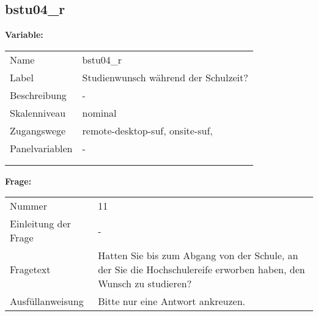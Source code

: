 	
	
	\subsection{bstu04\_r}
	\label{subSection:bstu04_r}

	\noindent\textbf{Variable:}\\
		\begin{tabular}{lL{11.3cm}}
			\label{tableVariable:bstu04_r}
			Name & bstu04\_r \\
			Label & Studienwunsch während der Schulzeit? \\
			Beschreibung & - \\
			Skalenniveau & nominal \\
			Zugangswege &
				remote-desktop-suf,
				onsite-suf,
 \\
			Panelvariablen & -
			 \\
			 \\
 \\
		\end{tabular}

		\vspace*{1 cm}
		\noindent\textbf{Frage:}\\
		\begin{tabular}{lL{11.3cm}}
			\label{tableQuestion:bstu04_r}
			Nummer & 11 \\
			Einleitung der Frage & - \\
			Fragetext & Hatten Sie bis zum Abgang von der Schule, an der Sie die Hochschulereife erworben haben, den Wunsch zu studieren? \\
			Ausfüllanweisung & Bitte nur eine Antwort ankreuzen. \\
		\end{tabular}






